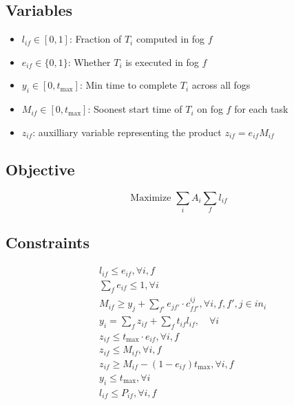 \subsection{Variables}
\begin{itemize}[leftmargin=*]
    \item $l_{if} \in [0,1]$: Fraction of $T_{i}$ computed in fog $f$
    \item $e_{if} \in \{0,1\}$: Whether $T_{i}$ is executed in fog $f$
    \item $y_{i} \in [0,t_{\max}]$: Min time to complete $T_i$ across all fogs
    \item $M_{if} \in [0,t_{\max}]$: Soonest start time of $T_i$ on fog $f$ for each task 
    \item $z_{if}$: auxilliary variable representing the product $z_{if}=e_{if} M_{if}$ 
\end{itemize}

\subsection*{Objective}
\begin{equation}
    \text{Maximize } \sum_i A_i \sum_f l_{if}  
\end{equation}
\subsection*{Constraints}

\begin{align}
    &l_{if} \leq e_{if}, \forall i, f \\ 
    &\sum_f e_{if} \leq 1, \forall i \\
    &M_{if} \geq y_j + \sum_{f'} e_{jf'} \cdot c_{ff'}^{ij}, \forall i, f, f', j \in in_i  \\
    &y_i = \sum_f z_{if} + \sum_f t_{if} l_{if} , \quad \forall i \\
    &z_{if} \leq t_{\max} \cdot e_{if}, \forall i,f\\
    &z_{if} \leq M_{if}, \forall i,f \\
    &z_{if} \geq M_{if} - (1 - e_{if}) t_{\max}, \forall i,f \\
    &y_i \leq t_{\max}, \forall i \\
    &l_{if} \leq P_{if}, \forall i,f 
\end{align}

